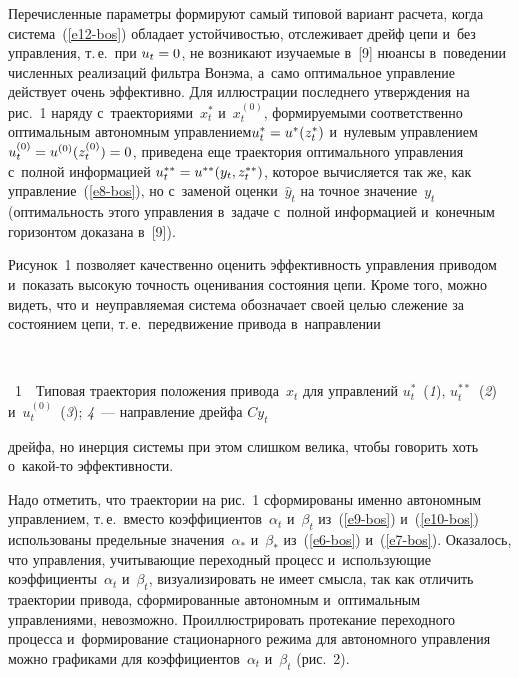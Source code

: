 \begin{multicols}{2}
     
     Перечисленные параметры формируют самый типовой вариант 
расчета, когда система~(\ref{e12-bos}) обладает устойчивостью, отслеживает 
дрейф цепи и~без управ\-ле\-ния, т.\,е.\ при $u_t\hm=0$, не возникают изуча\-емые 
в~[9] нюансы в~поведении чис\-лен\-ных реализаций фильт\-ра Вонэма, а~само 
оптимальное управ\-ле\-ние действует очень эффективно. Для иллюстрации\linebreak 
последнего утверж\-де\-ния на рис.~1 наряду с~траекториями~$x_t^*$ 
и~$x_t^{(0)}$, фор\-ми\-ру\-емы\-ми соответственно оптимальным автономным 
управ\-ле\-ни\-ем\linebreak $u_t^*\hm= u^*(z_t^*)$ и~нулевым управ\-ле\-нием $u_t^{(0)} \hm= 
u^{(0)}(z_t^{(0)})\hm=0$, приведена еще траектория оптимального 
управ\-ле\-ния с~полной информацией $u_t^{**}\hm= u^{**}(y_t, z_t^{**})$, 
которое вы\-чис\-ля\-ет\-ся так же, как
 управ\-ле\-ние~(\ref{e8-bos}), но с~заменой 
оценки~$\hat{y}_t$ на точ\-ное значение~$y_t$ (оп\-ти\-маль\-ность этого управ\-ле\-ния
в~задаче с~полной информацией и~конечным горизонтом доказана 
в~[9]).




     Рисунок~1 позволяет качественно оценить эффективность управления 
приводом и~показать высокую точность оценивания состояния цепи. Кроме 
того, можно видеть, что и~неуправляемая система
  обозначает своей целью 
слежение за состоянием цепи, т.\,е.\
передвижение привода в~направлении\linebreak\vspace*{-12pt}

{ \begin{center}  %
 \vspace*{9pt}
   \mbox{%
 \epsfxsize=79mm 
 }

\end{center}

\vspace*{-2pt}

\noindent
{{\figurename~1}\ \ \small{Типовая траектория положения привода~$x_t$ для управлений 
$u_t^*$~(\textit{1}), $u_t^{**}$~(\textit{2}) и~$u_t^{(0)}$~(\textit{3}); \textit{4}~--- 
направление дрейфа $Cy_t$
}}}


\noindent 
дрейфа, но инерция системы при этом слишком велика, чтобы говорить хоть  
о~ка\-кой-то эффективности.
     
     Надо отметить, что траектории на рис.~1 сформированы именно 
автономным управлением, т.\,е.\ 
  вместо коэффициентов~$\alpha_t$ 
и~$\beta_t$  
из~(\ref{e9-bos}) и~(\ref{e10-bos}) использованы предельные 
значения~$\alpha_*$ и~$\beta_*$ из~(\ref{e6-bos}) и~(\ref{e7-bos}). 
Оказалось, что управ\-ле\-ния, учи\-ты\-ва\-ющие переходный процесс 
и~использующие коэффициенты~$\alpha_t$ и~$\beta_t$, визуализировать не 
имеет смысла, так как отличить траектории привода, сформированные 
автономным и~оптимальным управ\-ле\-ни\-ями, невозможно. 
Проиллюстрировать протекание переходного процесса и~формирование 
стационарного режима для автономного управ\-ле\-ния можно графиками для 
коэффициентов~$\alpha_t$ и~$\beta_t$ (рис.~2).



\end{multicols}

